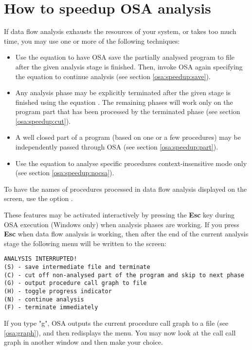 \section{How to speedup OSA analysis}
\label{osa:speedup}

If data flow analysis exhausts the resources of your system,
or takes too much time, you may use one or more of
the following techniques:

\begin{itemize}
\item Use the equation  to have OSA save the partially
      analysed program to file after the given analysis stage
      is finished. Then, invoke OSA again specifying the equation
       to continue analysis (see section \ref{osa:speedup:save}).
\item Any analysis phase may be explicitly terminated after the
      given stage is finished using the equation .
      The remaining phases will work only on the program part
      that has been processed by the terminated phase (see section \ref{osa:speedup:cut}). 
\item A well closed part of a program (based on one or a few procedures) 
      may be independently passed through OSA (see section \ref{osa:speedup:part}).
\item Use the equation  to analyse specific
      procedures context-insensitive mode only (see section \ref{osa:speedup:nocsa}).
\end{itemize}

To have the names of procedures processed in data flow analysis
displayed on the screen, use the option .

These features may be activated interactively by pressing the {\bf Esc}
key during OSA execution (Windows only) when analysis phases
are working. If you press {\bf Esc} when data flow analysis is working, 
then after the end of the current analysis stage the following menu
will be written to the screen:

\begin{verbatim}
ANALYSIS INTERRUPTED!
(S) - save intermediate file and terminate
(C) - cut off non-analysed part of the program and skip to next phase
(G) - output procedure call graph to file
(H) - toggle progress indicator
(N) - continue analysis
(F) - terminate immediately
\end{verbatim}

If you type "g", OSA outputs the current procedure call graph to
a file (see \ref{osa:graph}), and then redisplays the menu. 
You may now look at the call call graph in another window and 
then make your choice.

